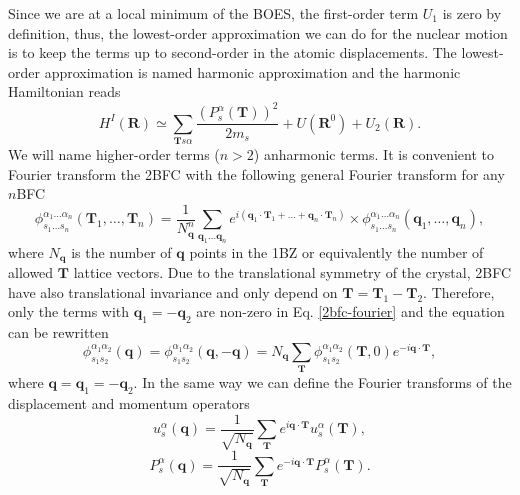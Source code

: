 Since we are at a local minimum of the BOES, the first-order term $U_{1}$ is zero by definition, thus, the lowest-order approximation we can do for the nuclear motion is to keep the terms up to second-order in the atomic 
displacements. The lowest-order approximation is named harmonic approximation and the harmonic Hamiltonian reads
\begin{equation}
 H^{I}(\mathbf{R})\simeq\sum_{\mathbf{T}s\alpha}\frac{(P_{s}^{\alpha}(\mathbf{T}))^{2}}{2m_{s}}+U(\mathbf{R}^{0})+U_{2}(\mathbf{R}).
\end{equation}
We will name higher-order terms ($n>2$) anharmonic terms. It is convenient to Fourier transform the 2BFC  with the following general Fourier transform for any $n$BFC
\begin{equation}
 \label{2bfc-fourier}
 \phi_{s_{1}\dots s_{n}}^{\alpha_{1}\dots\alpha_{n}}(\mathbf{T}_{1},\dots,\mathbf{T}_{n})=\frac{1}{N_{\mathbf{q}}^{n}}\sum_{\mathbf{q}_{1}\dots\mathbf{q}_{n}}e^{i(\mathbf{q}_{1}\cdot\mathbf{T}_{1}+\dots+\mathbf{q}_{
 n}\cdot\mathbf{T}_{n})}\times\phi_{s_{1}\dots s_{n}}^{\alpha_{1}\dots\alpha_{n}}(\mathbf{q}_{1},\dots,\mathbf{q}_{n}),
\end{equation}
where $N_{\mathbf{q}}$ is the number of $\mathbf{q}$ points in the 1BZ or equivalently the number of allowed $\mathbf{T}$ lattice vectors. Due to the translational symmetry of the crystal, 2BFC have also translational invariance and only 
depend on $\mathbf{T}=\mathbf{T}_{1}-\mathbf{T}_{2}$. Therefore, only the terms with $\mathbf{q}_{1}=-\mathbf{q}_{2}$ are non-zero in 
Eq. \ref{2bfc-fourier} and the equation can be rewritten
\begin{equation}
 \phi_{s_{1}s_{2}}^{\alpha_{1}\alpha_{2}}(\mathbf{q})=\phi_{s_{1}s_{2}}^{\alpha_{1}\alpha_{2}}(\mathbf{q},-\mathbf{q})=N_{\mathbf{q}}\sum_{\mathbf{T}}\phi_{s_{1}s_{2}}^{\alpha_{1}\alpha_{2}}(\mathbf{T},0)e^{-i\mathbf{
 q}\cdot\mathbf{T}},
\end{equation} 
where $\mathbf{q}=\mathbf{q}_{1}=-\mathbf{q}_{2}$. In the same way we can define the Fourier transforms of the displacement and momentum operators
\begin{equation}
 \label{displacement-fourier}
 u_{s}^{\alpha}(\mathbf{q})=\frac{1}{\sqrt{N_{\mathbf{q}}}}\sum_{\mathbf{T}}e^{i\mathbf{q}\cdot\mathbf{T}}u_{s}^{\alpha}(\mathbf{T}),
\end{equation}
\begin{equation}
 \label{momentum-fourier}
 P_{s}^{\alpha}(\mathbf{q})=\frac{1}{\sqrt{N_{\mathbf{q}}}}\sum_{\mathbf{T}}e^{-i\mathbf{q}\cdot\mathbf{T}}P_{s}^{\alpha}(\mathbf{T}).
\end{equation}
